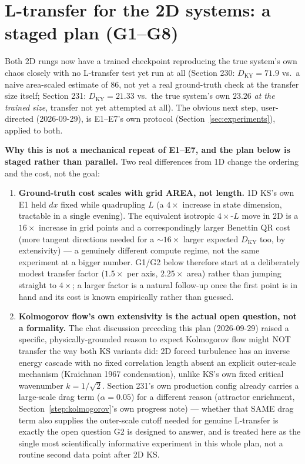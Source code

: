 \documentclass[11pt]{article}
\begin{document}
\section{L-transfer for the 2D systems: a staged plan (G1--G8)}
\label{sec:2d_transfer_plan}

Both 2D rungs now have a trained checkpoint reproducing the true
system's own chaos closely with no L-transfer test yet run at all
(Section 230: $D_{\mathrm{KY}}=71.9$ vs.\ a naive area-scaled estimate of
$86$, not yet a real ground-truth check at the transfer size itself;
Section 231: $D_{\mathrm{KY}}=21.33$ vs.\ the true system's own $23.26$
\emph{at the trained size}, transfer not yet attempted at all). The
obvious next step, user-directed (2026-09-29), is E1--E7's own protocol
(Section~\ref{sec:experiments}), applied to both.

\textbf{Why this is not a mechanical repeat of E1--E7, and the plan
below is staged rather than parallel.} Two real differences from 1D
change the ordering and the cost, not the goal:

\begin{enumerate}[nosep]
\item \textbf{Ground-truth cost scales with grid AREA, not length.} 1D
  KS's own E1 held $dx$ fixed while quadrupling $L$ (a $4\times$ increase
  in state dimension, tractable in a single evening). The equivalent
  isotropic $4\times$-$L$ move in 2D is a $16\times$ increase in grid
  points and a correspondingly larger Benettin QR cost (more tangent
  directions needed for a $\sim16\times$ larger expected $D_{\mathrm{KY}}$
  too, by extensivity) --- a genuinely different compute regime, not the
  same experiment at a bigger number. G1/G2 below therefore start at a
  deliberately modest transfer factor ($1.5\times$ per axis, $2.25\times$
  area) rather than jumping straight to $4\times$; a larger factor is a
  natural follow-up once the first point is in hand and its cost is
  known empirically rather than guessed.
\item \textbf{Kolmogorov flow's own extensivity is the actual open
  question, not a formality.} The chat discussion preceding this plan
  (2026-09-29) raised a specific, physically-grounded reason to expect
  Kolmogorov flow might NOT transfer the way both KS variants did: 2D
  forced turbulence has an inverse energy cascade with no fixed
  correlation length absent an explicit outer-scale mechanism (Kraichnan
  1967 condensation), unlike KS's own fixed critical wavenumber
  $k=1/\sqrt2$. Section 231's own production config already carries a
  large-scale drag term ($\alpha=0.05$) for a different reason
  (attractor enrichment, Section~\ref{step:kolmogorov}'s own progress
  note) --- whether that SAME drag term also supplies the outer-scale
  cutoff needed for genuine L-transfer is exactly the open question G2
  is designed to answer, and is treated here as the single most
  scientifically informative experiment in this whole plan, not a
  routine second data point after 2D KS.
\end{enumerate}
\end{document}
